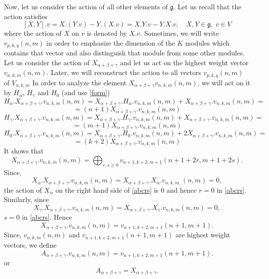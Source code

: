 \documentclass[twoside,a4paper,12pt]{article}
\newcommand{\g}{\ensuremath{\mathfrak g}}
\theoremstyle{definition}
\begin{document}
Now, let us consider the action of all other elements of \g.
Let us recall that the action satisfies
\begin{equation}\label{form}
	[X,Y].v=X.(Y.v)-Y.(X.v)=X.Y.v-Y.X.v,\quad X,Y\in\g,\;v\in V
\end{equation}
where the action of $X$ on $v$ is denoted by $X.v$.
Sometimes, we will write $v_{p,k,q}(n,m)$ in order to emphasize the dimension
of the $K$ modules which contains that vector and also distinguish that module
from some other modules.
Let us consider the action of $X_{\alpha+\beta+\gamma}$ and let us act on the
highest weight vector $v_{n,k,m}(n,m)$. Later, we will reconstruct the action
to all vectors $v_{p,k,q}(n,m)$ of $V_{n,k,m}$
In order to analyze the element $X_{\alpha+\beta+\gamma}v_{n,k,m}(n,m)$,
we will act on it by $H_\alpha$, $H_\gamma$ and $H_0$ (and use \eqref{form})
\[ H_\alpha.X_{\alpha+\beta+\gamma}.v_{n,k,m}(n,m)=
	X_{\alpha+\beta+\gamma}.H_\alpha.v_{n,k,m}(n,m)+X_{\alpha+\beta+\gamma}.
	v_{n,k,m}(n,m)= \]
\[ =(n+1)X_{\alpha+\beta+\gamma}.v_{n,k,m}(n,m) \]
\[ H_\gamma.X_{\alpha+\beta+\gamma}.v_{n,k,m}(n,m)=
	X_{\alpha+\beta+\gamma}.H_\gamma.v_{n,k,m}(n,m)+X_{\alpha+\beta+\gamma}.
	v_{n,k,m}(n,m)= \]
\[ =(m+1)X_{\alpha+\beta+\gamma}.v_{n,k,m}(n,m) \]
\[ H_0.X_{\alpha+\beta+\gamma}.v_{n,k,m}(n,m)=
	X_{\alpha+\beta+\gamma}.H_0.v_{n,k,m}(n,m)+2X_{\alpha+\beta+\gamma}.
	v_{n,k,m}(n,m)= \]
\[ =(k+2)X_{\alpha+\beta+\gamma}.v_{n,k,m}(n,m) \]
It shows that
\begin{equation}\label{abcrs}
	X_{\alpha+\beta+\gamma}.v_{n,k,m}(n,m)=
	\bigoplus_{r,s\geq 0}v_{n+1,k+2,m+1}(n+1+2r,m+1+2s).
\end{equation}
Since,
\[ X_\alpha.X_{\alpha+\beta+\gamma}.v_{n,k,m}(n,m)=
	X_{\alpha+\beta+\gamma}.X_\alpha.v_{n,k,m,}(n,m)=0, \]
the action of $X_\alpha$ on the right hand side of \eqref{abcrs}
is 0 and hence $r=0$ in \eqref{abcrs}. Similarly, since
\[ X_\gamma.X_{\alpha+\beta+\gamma}.v_{n,k,m}(n,m)=
	X_{\alpha+\beta+\gamma}.X_\gamma.v_{n,k,m}(n,m)=0, \]
$s=0$ in \eqref{abcrs}. Hence
\begin{equation}\label{abc}
	X_{\alpha+\beta+\gamma}.v_{n,k,m}(n,m)=v_{n+1,k+2,m+1}(n+1,m+1).
\end{equation}
Since, $v_{n,k,m}(n,m)$ and $v_{n+1,k+2,m+1}(n+1,m+1)$ are highest weight
vectors, we define
\begin{equation*}%
	A_{\alpha+\beta+\gamma}.v_{n,k,m}(n,m)=v_{n+1,k+2,m+1}(n+1,m+1).
\end{equation*}
or
\begin{equation*}%
	A_{\alpha+\beta+\gamma}=X_{\alpha+\beta+\gamma}.
\end{equation*}
\end{document}

